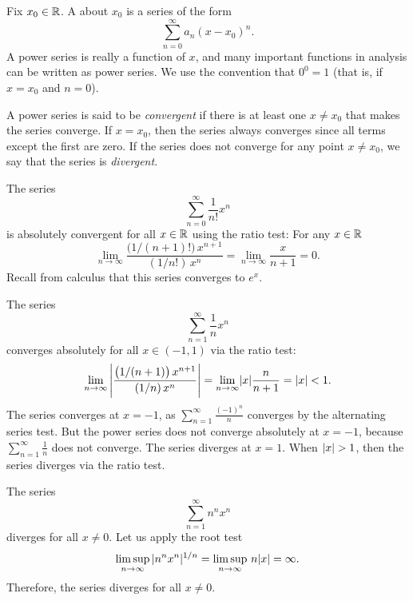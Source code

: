 Fix $x_0 \in {\mathbb{R}}$.
A \emph{} about $x_0$
is a series of the form
\begin{equation*}
\sum_{n=0}^\infty a_n {(x-x_0)}^n .
\end{equation*}
A power series is really a function of $x$, and
many important functions in analysis can be written
as power series.  We use the convention that
$0^0 = 1$ (that is, if $x=x_0$ and $n=0$).

A power series is said to be
\emph{convergent} if
there is at least one $x \neq x_0$ that makes the series converge.
If $x=x_0$, then the series always
converges since all terms except the first are zero.
If the series does not converge for any point $x \neq x_0$, we say that
the series is \emph{divergent}.

\begin{example} \label{ps:expex}
The series
\begin{equation*}
\sum_{n=0}^\infty \frac{1}{n!} x^n
\end{equation*}
is absolutely convergent for all $x \in {\mathbb{R}}$ using the ratio test:
For any $x \in {\mathbb{R}}$
\begin{equation*}
\lim_{n \to \infty}
\frac{\bigl(1/(n+1)!\bigr) \, x^{n+1}}{(1/n!) \, x^{n}}
=
\lim_{n \to \infty}
\frac{x}{n+1}
=
0.
\end{equation*}
Recall from calculus that this series converges to $e^x$.
\end{example}

\begin{example} \label{ps:1kex}
The series
\begin{equation*}
\sum_{n=1}^\infty \frac{1}{n} x^n
\end{equation*}
converges absolutely for all $x \in (-1,1)$ via the ratio test:
\begin{equation*}
\lim_{n \to \infty}
\left\lvert {
\frac{\bigl(1/(n+1) \bigr) \, x^{n+1}}{(1/n) \, x^{n}}
} \right\rvert
=
\lim_{n \to \infty}
\lvert {x} \rvert \frac{n}{n+1}
=
\lvert {x} \rvert < 1 .
\end{equation*}
The series converges at $x=-1$,
as
$\sum_{n=1}^\infty \frac{{(-1)}^n}{n}$ converges
by the alternating series
test.
But the power series does not converge absolutely at $x=-1$, because
$\sum_{n=1}^\infty \frac{1}{n}$ does not converge.
The series
diverges at $x=1$.
When $\lvert {x} \rvert > 1$, then the series diverges via the ratio test.
\end{example}

\begin{example} \label{ps:divergeex}
The series
\begin{equation*}
\sum_{n=1}^\infty n^n x^n
\end{equation*}
diverges for all $x \neq 0$.  Let us apply the root test
\begin{equation*}
\limsup_{n\to\infty}
\,
\lvert {n^n x^n} \rvert^{1/n}
=
\limsup_{n\to\infty}
\,
n \lvert {x} \rvert
= \infty .
\end{equation*}
Therefore, the series diverges for all $x \neq 0$.
\end{example}

